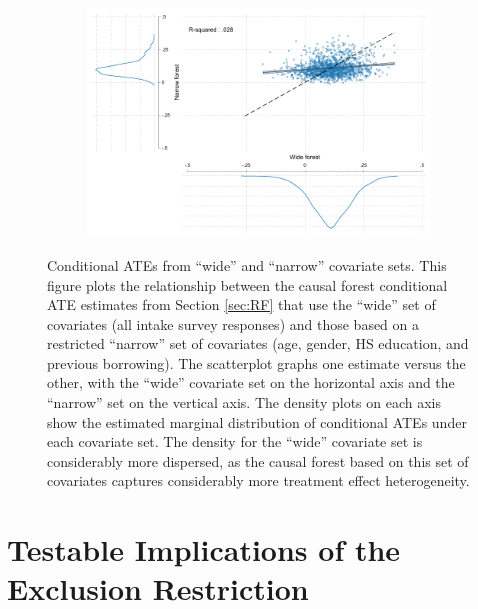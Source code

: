 \begin{appendix}
\begin{figure}[h!]
    \begin{center}
    \begin{subfigure}{0.75\textwidth}
        \centering
        \includegraphics[width=\textwidth]{Figuras/scatter_hist_wide_narrow.pdf}
    \end{subfigure}
    \end{center}
       \caption{Conditional ATEs from ``wide'' and ``narrow'' covariate sets. This figure plots the relationship between the causal forest conditional ATE estimates from Section \ref{sec:RF} that use the ``wide'' set of covariates (all intake survey responses) and those based on a restricted ``narrow'' set of covariates (age, gender, HS education, and previous borrowing). The scatterplot graphs one estimate versus the other, with the ``wide'' covariate set on the horizontal axis and the ``narrow'' set on the vertical axis. The density plots on each axis show the estimated marginal distribution of conditional ATEs under each covariate set. The density for the ``wide'' covariate set is considerably more dispersed, as the causal forest based on this set of covariates captures considerably more treatment effect heterogeneity.}
    \label{wide_narrow_forests}

\end{figure}


\section{Testable Implications of the Exclusion Restriction} \label{sec:testing_exclusion}


\end{appendix}
